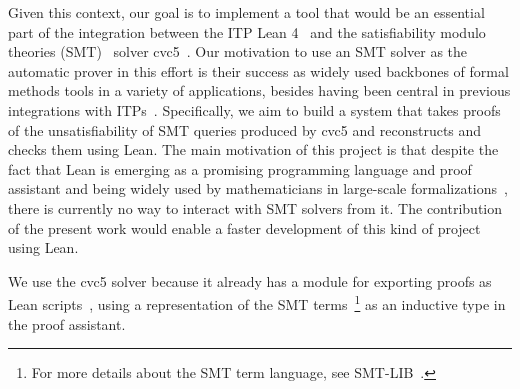 Given this context, our goal is to implement a tool that would be an essential
part of the integration between the ITP Lean 4~\cite{lean} and the
satisfiability modulo theories (SMT)~\cite{Barrett2018}
solver cvc5~\cite{cvc5}.
%
Our motivation to use an SMT solver as the automatic prover in this effort is
their success as widely used backbones of formal methods tools in a variety of
applications, besides having been central in previous integrations with
ITPs~\cite{sledgehammer, smtcoq}.
%
Specifically, we aim to build a system that takes proofs of the unsatisfiability of
SMT queries produced by cvc5 and reconstructs and checks them using Lean.
%
The main motivation of this project is that despite the fact that Lean is
emerging as a promising programming language and proof assistant and being
widely used by mathematicians in large-scale
formalizations~\cite{mathlib, scholze}, there is currently no way to
interact with SMT solvers from it. The contribution of the present work
would enable a faster development of this kind of project using Lean.

We use the cvc5 solver because it already has a module for exporting proofs as
Lean scripts~\cite{Barbosa2022}, using a representation of the SMT terms~\footnote{For more details
about the SMT term language, see SMT-LIB~\cite{smtlib}.} as an inductive type in
the proof assistant.
